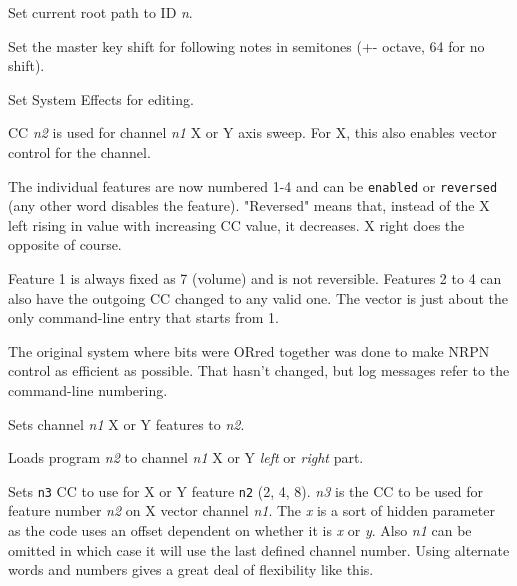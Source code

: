       Set current root path to ID \textsl{n}.

      Set the master key shift for following notes in semitones (+-
      octave, 64 for no shift).

      Set System Effects for editing.

      CC \textsl{n2} is used for channel \textsl{n1} X or Y axis sweep.
      For X, this also enables vector control for the channel.

      The individual features are now numbered 1-4 and can be
       \texttt{enabled} or
       \texttt{reversed} (any
      other word disables the feature).
      "Reversed" means that, instead of the X left rising in
      value with increasing CC value, it decreases.
      X right does the opposite of course.

      Feature 1 is always fixed as 7 (volume) and is not reversible.
      Features 2 to 4 can also have the outgoing CC changed to any valid one.
      The vector is just about the only command-line
      entry that starts from 1.

      The original system where bits were ORred together was done to make NRPN
      control as efficient as possible. That hasn't changed, but log messages
      refer to the command-line numbering.

      Sets channel \textsl{n1} X or Y features to \textsl{n2}.

      Loads program \textsl{n2} to channel \textsl{n1} X or Y
      \textsl{left} or \textsl{right} part.

      Sets \texttt{n3} CC to use for X or Y feature \texttt{n2} (2, 4, 8).
      \textsl{n3} is the CC to be used for feature number \textsl{n2} on X
      vector channel \textsl{n1}. The \textsl{x} is a sort of hidden parameter
      as the code uses an offset dependent on whether it is \textsl{x} or
      \textsl{y}. Also \textsl{n1} can be omitted in which case it will use the
      last defined channel number. Using alternate words and numbers gives a
      great deal of flexibility like this.

